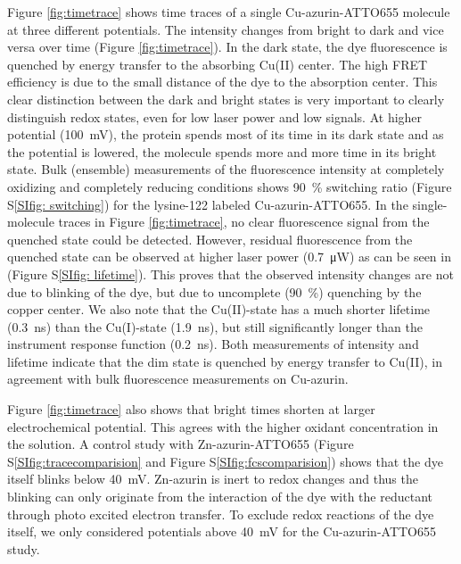 \documentclass[journal=jacsat,manuscript=article]{achemso}
\begin{document}
Figure \ref{fig:timetrace} shows time traces of a single Cu-azurin-ATTO655 molecule at three different potentials. 
The intensity changes from bright to dark and vice versa over time (Figure \ref{fig:timetrace}).
In the dark state, the dye fluorescence is quenched by energy transfer to the absorbing Cu(II) center\cite{kuznetsova2006a}. The high FRET efficiency is due to the small distance of the dye to the absorption center. This clear distinction between the dark and bright states is very important to clearly distinguish redox states, even for low laser power and low signals.
At higher potential (\SI{100}{\mV}), the protein spends most of its time in its dark state and as the potential is lowered, the molecule spends more and more time in its bright state.
Bulk (ensemble) measurements of the fluorescence intensity at completely oxidizing and completely reducing conditions shows \SI{90}{\percent} switching ratio (Figure S\ref{SIfig: switching}) for the lysine-122 labeled Cu-azurin-ATTO655.\cite{nicolardi2012topdown}
In the single-molecule traces in Figure \ref{fig:timetrace}, no clear fluorescence signal from the quenched state could be detected. However, residual fluorescence from the quenched state can be observed at higher laser power (\SI{0.7}{\uW}) as can be seen in (Figure S\ref{SIfig: lifetime}). This proves that the observed intensity changes are not due to blinking of the dye, but due to uncomplete (\SI{90}{\percent}) quenching by the copper center. 
We also note that the Cu(II)-state has a much shorter lifetime (\SI{0.3}{\ns}) than the Cu(I)-state (\SI{1.9}{\ns}), but still significantly longer than the instrument response function (\SI{0.2}{\ns}). 
Both measurements of intensity and lifetime indicate that the dim state is quenched by energy transfer to Cu(II), in agreement with bulk fluorescence measurements on Cu-azurin.

Figure \ref{fig:timetrace} also shows that bright times shorten at larger electrochemical potential. This agrees with the higher oxidant concentration in the solution. 
A control study with Zn-azurin-ATTO655 (Figure S\ref{SIfig:tracecomparision} and Figure S\ref{SIfig:fcscomparision}) shows that the dye itself blinks below \SI{40}{\mV}. Zn-azurin is inert to redox changes and thus the blinking can only originate from the interaction of the dye with the reductant through photo excited electron transfer. To exclude redox reactions of the dye itself, we only considered potentials above \SI{40}{\mV} for the Cu-azurin-ATTO655 study.\\
\end{document}
